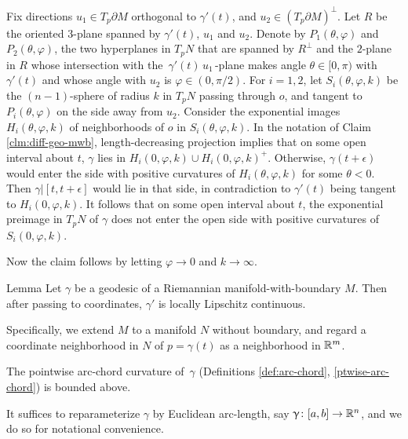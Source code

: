 Fix directions $u_1\in T_p\partial M$  orthogonal to $\gamma'(t)$, and $u_2\in  (T_p\partial M)^\perp$.  Let $R$ be the oriented $3$-plane  spanned by $\gamma'(t)$, $u_1$ and $u_2$.  Denote by $P_1(\theta,\varphi)$ and $P_2(\theta,\varphi)$, the two hyperplanes in $T_pN$ that are spanned by $R^\perp$ and  the $2$-plane in $R$ whose intersection with  the $\,\gamma'(t)\,u_1\,$-plane makes angle $\theta\in [0,\pi)$ with $\gamma'(t)$ and whose angle with $u_2$ is $\varphi\in (0,\pi/2)$.
For $i=1,2$, let $S_i(\theta, \varphi, k)$ be the $(n-1)$-sphere of radius $k$ in $T_pN$ passing through $o$, and  tangent to $P_i(\theta,\varphi)$ on the side away from $u_2$.  Consider the exponential images $H_i(\theta, \varphi, k)$  of  neighborhoods of $o$ in $S_i(\theta, \varphi, k)$.  
In the notation of Claim \ref{clm:diff-geo-mwb}, length-decreasing projection implies that on some open interval about $t$, $\gamma$ lies in $H_i(0, \varphi, k)\cup H_i(0, \varphi, k)^+$.  Otherwise, $\gamma(t+\epsilon)$ would enter the side with positive curvatures of $H_i(\theta, \varphi, k)$ for some $\theta<0$.  Then $\gamma|[t, t+\epsilon]$ would lie in that side, in contradiction to $\gamma'(t)$ being tangent to $H_i(0, \varphi, k)$.  It follows that on some open interval about $t$, the exponential preimage in $T_pN$ of $\gamma$  does not enter the open side with positive curvatures of $S_i(0,\varphi, k)$.

Now the claim follows by letting $\varphi\to 0$ and $k\to\infty$.
\qeds

\begin{thm}{Lemma}\label{lem:abs-cont}
Let $\gamma$ be a geodesic of a Riemannian manifold-with-boundary $M$. Then after passing to coordinates, 
$\gamma'$  is  locally Lipschitz continuous.  
\end{thm}

Specifically,  we extend $M$ to a manifold $N$ without boundary, and regard a  coordinate neighborhood in $N$ of $p=\gamma(t)$ as a neighborhood  in $\mathbb{R}^m$.

\begin{clm}{}\label{clm:pointwise-k-bound}
The pointwise arc-chord curvature  of  $\,\gamma$ (Definitions \ref{def:arc-chord}, \ref{ptwise-arc-chord}) is bounded above.
\end{clm}
It suffices to reparameterize $\gamma$ by Euclidean arc-length, say $\gamma\:[a,b]\to \R^n$, and we do so for notational convenience. 

